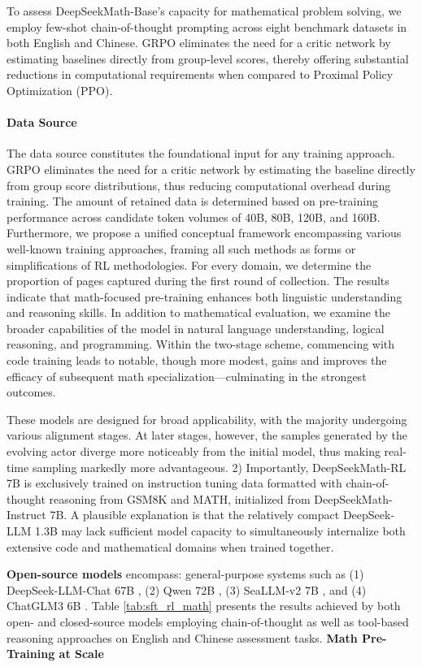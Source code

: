 {\begin{itemize}[topsep=0pt]
To assess DeepSeekMath-Base's capacity for mathematical problem solving, we employ few-shot chain-of-thought prompting \citep{cot} across eight benchmark datasets in both English and Chinese. GRPO eliminates the need for a critic network by estimating baselines directly from group-level scores, thereby offering substantial reductions in computational requirements when compared to Proximal Policy Optimization (PPO). \paragraph{Data Source} The data source constitutes the foundational input for any training approach. GRPO eliminates the need for a critic network by estimating the baseline directly from group score distributions, thus reducing computational overhead during training. The amount of retained data is determined based on pre-training performance across candidate token volumes of 40B, 80B, 120B, and 160B. Furthermore, we propose a unified conceptual framework encompassing various well-known training approaches, framing all such methods as forms or simplifications of RL methodologies. For every domain, we determine the proportion of pages captured during the first round of collection. The results indicate that math-focused pre-training enhances both linguistic understanding and reasoning skills. In addition to mathematical evaluation, we examine the broader capabilities of the model in natural language understanding, logical reasoning, and programming. Within the two-stage scheme, commencing with code training leads to notable, though more modest, gains and improves the efficacy of subsequent math specialization—culminating in the strongest outcomes. \end{itemize}

These models are designed for broad applicability, with the majority undergoing various alignment stages. At later stages, however, the samples generated by the evolving actor diverge more noticeably from the initial model, thus making real-time sampling markedly more advantageous. 2) Importantly, DeepSeekMath-RL 7B is exclusively trained on instruction tuning data formatted with chain-of-thought reasoning from GSM8K and MATH, initialized from DeepSeekMath-Instruct 7B. A plausible explanation is that the relatively compact DeepSeek-LLM 1.3B may lack sufficient model capacity to simultaneously internalize both extensive code and mathematical domains when trained together. \item \textbf{Open-source models} encompass: general-purpose systems such as (1) DeepSeek-LLM-Chat 67B \citep{deepseek-llm}, (2) Qwen 72B \citep{qwen}, (3) SeaLLM-v2 7B \citep{seallm}, and (4) ChatGLM3 6B \citep{chatglm3}. Table \ref{tab:sft_rl_math} presents the results achieved by both open- and closed-source models employing chain-of-thought as well as tool-based reasoning approaches on English and Chinese assessment tasks. \textbf{Math Pre-Training at Scale}

}
